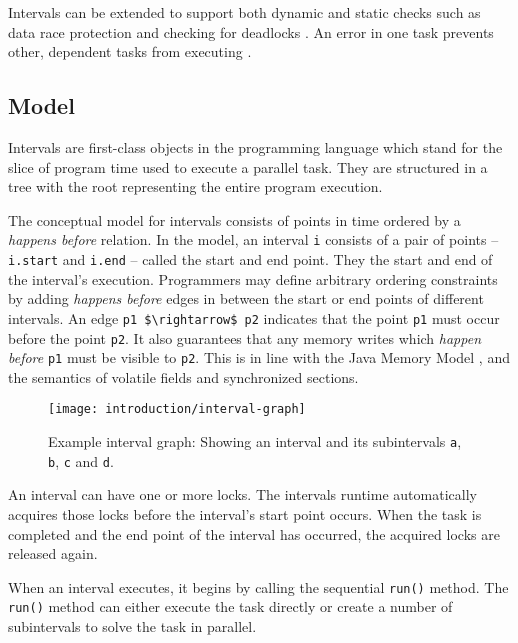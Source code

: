Intervals can be extended to support both dynamic and static checks
such as data race protection \cite{Matsakis2010b} and checking for
deadlocks \cite{Matsakis2009}. An error in one task prevents other,
dependent tasks from executing \cite{Matsakis2010a}.

\subsection{Model}
\label{sec:intro-intervals-model}

Intervals are first-class objects in the programming language which
stand for the slice of program time used to execute a parallel task.
They are structured in a tree with the root representing the entire
program execution.

The conceptual model for intervals consists of points in time ordered
by a \emph{happens before} relation. In the model, an interval
\lstinline!i! consists of a pair of points -- \lstinline!i.start! and
\lstinline!i.end! -- called the start and end point. They the start
and end of the interval's execution. Programmers may define arbitrary
ordering constraints by adding \emph{happens before} edges in between
the start or end points of different intervals. An edge
\lstinline!p1 $\rightarrow$ p2! indicates that the point
\lstinline!p1! must occur before the point \lstinline!p2!. It also
guarantees that any memory writes which \emph{happen before}
\lstinline!p1! must be visible to \lstinline!p2!. This is in line with
the Java Memory Model \cite{Manson2005}, and the semantics of volatile
fields and synchronized sections.

\begin{figure}[htb]
  \centering
  \texttt{[image: introduction/interval-graph]}
  \caption[Example interval graph]{Example interval graph: Showing an
    interval and its subintervals \lstinline!a!, \lstinline!b!,
    \lstinline!c! and \lstinline!d!.}
  \label{fig:introduction-interval-graph}
\end{figure}

An interval can have one or more locks. The intervals runtime
automatically acquires those locks before the interval's start point
occurs. When the task is completed and the end point of the interval
has occurred, the acquired locks are released again.

When an interval executes, it begins by calling the sequential
\lstinline!run()! method. The \lstinline!run()! method can either
execute the task directly or create a number of subintervals to solve
the task in parallel.

